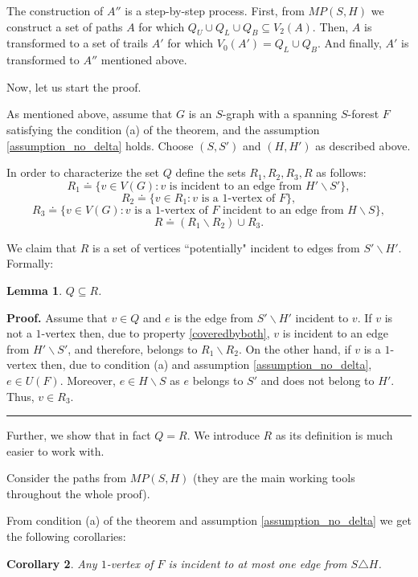 \documentclass[a4paper, 12pt]{article}
\newtheorem{lemma}{Lemma}[subsection]
\newtheorem{corollary}[lemma]{Corollary}
\newenvironment{proof}[1][Proof]{\noindent\textbf{#1.} }{\ \rule{0.5em}{0.5em}}
\begin{document}
The construction of $A''$ is a step-by-step process. First, from
$MP(S, H)$ we construct a set of paths $A$ for which $Q_U \cup Q_L
\cup Q_B \subseteq V_2(A)$. Then, $A$ is transformed to a set of
trails $A'$ for which $V_0(A') = Q_L \cup Q_B$. And finally, $A'$ is
transformed to $A''$ mentioned above.

\bigskip

Now, let us start the proof.

As mentioned above, assume that $G$ is an $S$-graph with a spanning
$S$-forest $F$ satisfying the condition (a) of the theorem, and the
assumption \ref{assumption_no_delta} holds. Choose $(S, S')$ and
$(H, H')$ as described above.

In order to characterize the set $Q$ define the sets $R_1, R_2, R_3,
R$ as follows:
$$R_1 \doteq \{v \in V(G) : v \text{ is incident to an edge from } H'
\backslash S'\},$$
$$R_2 \doteq \{v \in R_1 : v \text{ is a 1-vertex of } F\},$$
$$R_3 \doteq \{v \in V(G) : v \text{ is a 1-vertex of $F$ incident
to an edge from } H \backslash S\},$$
$$R \doteq (R_1 \backslash R_2) \cup R_3.$$

We claim that $R$ is a set of vertices ``potentially" incident to
edges from $S' \backslash H'$. Formally:
\begin{lemma}\label{QinR}
$Q \subseteq R$.
\end{lemma}
\begin{proof}
Assume that $v \in Q$ and $e$ is the edge from $S' \backslash H'$
incident to $v$. If $v$ is not a $1$-vertex then, due to property
\ref{coveredbyboth}, $v$ is incident to an edge from $H' \backslash
S'$, and therefore, belongs to $R_1 \backslash R_2$. On the other
hand, if $v$ is a $1$-vertex then, due to condition (a) and
assumption \ref{assumption_no_delta}, $e \in U(F)$. Moreover, $e \in
H \backslash S$ as $e$ belongs to $S'$ and does not belong to $H'$.
Thus, $v \in R_3$.
\end{proof}

Further, we show that in fact $Q = R$. We introduce $R$ as its
definition is much easier to work with.

Consider the paths from $MP(S,H)$ (they are the main working tools
throughout the whole proof).

\bigskip

From condition (a) of the theorem and assumption
\ref{assumption_no_delta} we get the following corollaries:
\begin{corollary} \label{one_is_not_incident_to_two}
Any $1$-vertex of $F$ is incident to at most one edge from $S
\triangle H$.
\end{corollary}
\end{document}
